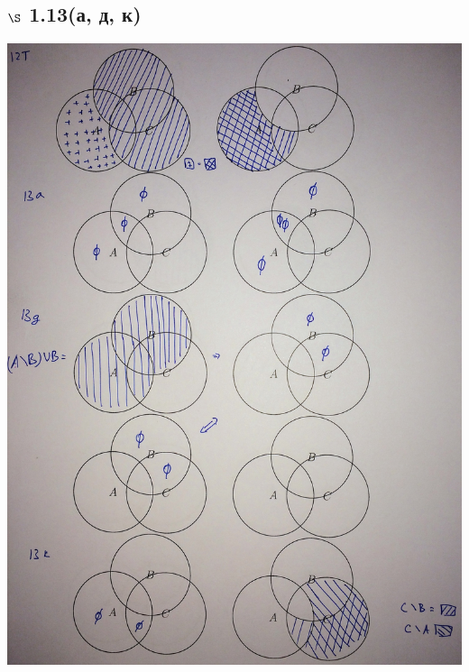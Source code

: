 \documentclass[a4paper,12pt]{article}
\begin{document}
\subsection*{$\S$ 1.13(а, д, к)}
\begin{center}
  \includegraphics[scale=0.15]{img/2.jpg}
\end{center}
\end{document}
